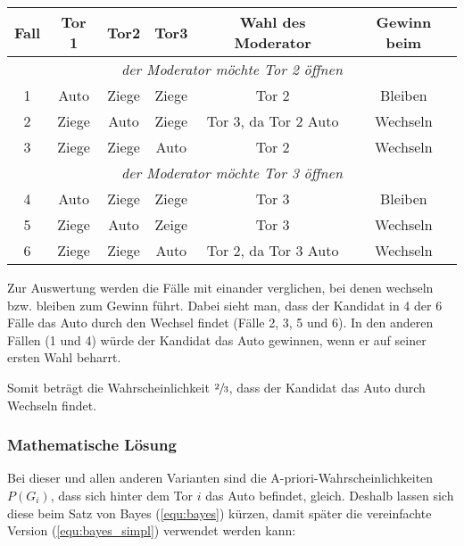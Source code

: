 \begin{tabular}[h]{|c|c|c|c|c|c|}
    \hline
    \textbf{Fall} & \textbf{Tor 1} & \textbf{Tor2} & \textbf{Tor3} & \textbf{Wahl des Moderator} & \textbf{Gewinn beim} \\
    \hline
    \multicolumn{6}{|c|}{\textit{der Moderator möchte Tor 2 öffnen} }                                                   \\
    \hline
    1             & Auto           & Ziege         & Ziege         & Tor 2                       & Bleiben              \\
    2             & Ziege          & Auto          & Ziege         & Tor 3, da Tor 2 Auto        & Wechseln             \\
    3             & Ziege          & Ziege         & Auto          & Tor 2                       & Wechseln             \\
    \hline
    \multicolumn{6}{|c|}{\textit{der Moderator möchte Tor 3 öffnen}
    }                                                                                                                   \\
    \hline
    4             & Auto           & Ziege         & Ziege         & Tor 3                       & Bleiben              \\
    5             & Ziege          & Auto          & Zeige         & Tor 3                       & Wechseln             \\
    6             & Ziege          & Ziege         & Auto          & Tor 2, da Tor 3 Auto        & Wechseln             \\
    \hline
\end{tabular}

Zur Auswertung werden die Fälle mit einander verglichen, bei denen wechseln bzw. bleiben zum Gewinn führt.
Dabei sieht man, dass der Kandidat in 4 der 6 Fälle das Auto durch den Wechsel findet (Fälle 2, 3, 5 und 6). In den anderen Fällen (1 und 4) würde der Kandidat das Auto gewinnen, wenn er auf seiner ersten Wahl beharrt.

Somit beträgt die Wahrscheinlichkeit $\sfrac{2}{3}$, dass der Kandidat das Auto durch Wechseln findet.

\subsubsection{Mathematische Lösung}

Bei dieser und allen anderen Varianten sind die A-priori-Wahrscheinlichkeiten $P(G_i)$, dass sich hinter dem Tor $i$ das Auto befindet, gleich. Deshalb lassen sich diese beim Satz von Bayes (\autoref{equ:bayes}) kürzen, damit später die vereinfachte Version (\autoref{equ:bayes_simpl}) verwendet werden kann:


